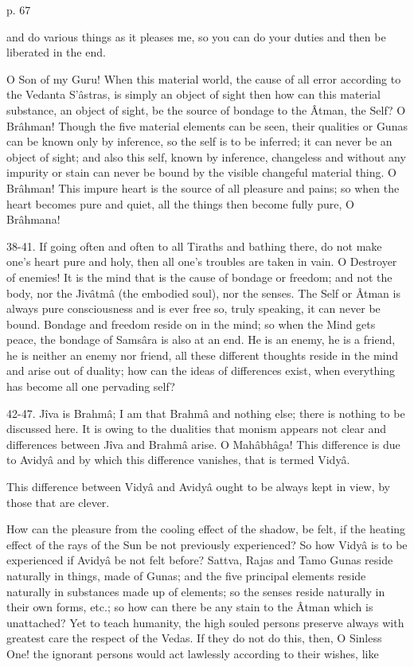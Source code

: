  

p. 67

 

and do various things as it pleases me, so you can do your duties and then be liberated in the end.

 

O Son of my Guru! When this material world, the cause of all error according to the Vedanta S’âstras, is simply an object of sight then how can this material substance, an object of sight, be the source of bondage to the Âtman, the Self? O Brâhman! Though the five material elements can be seen, their qualities or Gunas can be known only by inference, so the self is to be inferred; it can never be an object of sight; and also this self, known by inference, changeless and without any impurity or stain can never be bound by the visible changeful material thing. O Brâhman! This impure heart is the source of all pleasure and pains; so when the heart becomes pure and quiet, all the things then become fully pure, O Brâhmana!

 

38-41. If going often and often to all Tiraths and bathing there, do not make one's heart pure and holy, then all one's troubles are taken in vain. O Destroyer of enemies! It is the mind that is the cause of bondage or freedom; and not the body, nor the Jivâtmâ (the embodied soul), nor the senses. The Self or Âtman is always pure consciousness and is ever free so, truly speaking, it can never be bound. Bondage and freedom reside on in the mind; so when the Mind gets peace, the bondage of Samsâra is also at an end. He is an enemy, he is a friend, he is neither an enemy nor friend, all these different thoughts reside in the mind and arise out of duality; how can the ideas of differences exist, when everything has become all one pervading self?

 

42-47. Jîva is Brahmâ; I am that Brahmâ and nothing else; there is nothing to be discussed here. It is owing to the dualities that monism appears not clear and differences between Jîva and Brahmâ arise. O Mahâbhâga! This difference is due to Avidyâ and by which this difference vanishes, that is termed Vidyâ.

 

This difference between Vidyâ and Avidyâ ought to be always kept in view, by those that are clever.

 

How can the pleasure from the cooling effect of the shadow, be felt, if the heating effect of the rays of the Sun be not previously experienced? So how Vidyâ is to be experienced if Avidyâ be not felt before? Sattva, Rajas and Tamo Gunas reside naturally in things, made of Gunas; and the five principal elements reside naturally in substances made up of elements; so the senses reside naturally in their own forms, etc.; so how can there be any stain to the Âtman which is unattached? Yet to teach humanity, the high souled persons preserve always with greatest care the respect of the Vedas. If they do not do this, then, O Sinless One! the ignorant persons would act lawlessly according to their wishes, like

